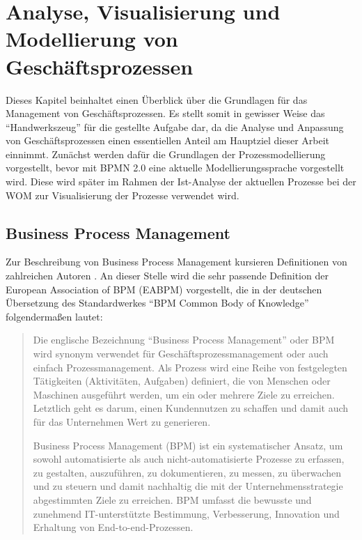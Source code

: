 \documentclass[a4paper,12pt]{report}
\begin{document}
\section{Analyse, Visualisierung und Modellierung von Geschäftsprozessen}\label{sec:BPM}
Dieses Kapitel beinhaltet einen Überblick über die Grundlagen für das Management von Geschäftsprozessen. Es stellt somit in gewisser Weise das "`Handwerkszeug"' für die gestellte Aufgabe dar, da die Analyse und Anpassung von Geschäftsprozessen einen essentiellen Anteil am Hauptziel dieser Arbeit einnimmt. Zunächst werden dafür die Grundlagen der Prozessmodellierung vorgestellt, bevor mit BPMN 2.0 eine aktuelle Modellierungssprache vorgestellt wird. Diese wird später im Rahmen der Ist-Analyse der aktuellen Prozesse bei der \ac{WOM} zur Visualisierung der Prozesse verwendet wird.
\subsection{Business Process Management}\label{subsec:BPManagement}
Zur Beschreibung von Business Process Management kursieren Definitionen von zahlreichen Autoren \citep[vgl.][S. 1]{Freund2014}. An dieser Stelle wird die sehr passende Definition der European Association of BPM (EABPM) vorgestellt, die in der deutschen Übersetzung des Standardwerkes "`BPM Common Body of Knowledge"' \cite[S. 38ff.]{Eabpm2009} folgendermaßen lautet:

\begin{quote}
Die englische Bezeichnung "`Business Process Management"' oder BPM wird synonym verwendet für Geschäftsprozessmanagement oder auch einfach Prozessmanagement. Als Prozess wird eine Reihe von festgelegten Tätigkeiten (Aktivitäten, Aufgaben) definiert, die von Menschen oder Maschinen ausgeführt werden, um ein oder mehrere Ziele zu erreichen. Letztlich geht es darum, einen Kundennutzen zu schaffen und damit auch für das Unternehmen Wert zu generieren.

Business Process Management (BPM) ist ein systematischer Ansatz, um sowohl automatisierte als auch nicht-automatisierte Prozesse zu erfassen, zu gestalten, auszuführen, zu dokumentieren, zu messen, zu überwachen und zu steuern und damit nachhaltig die mit der Unternehmensstrategie abgestimmten Ziele zu erreichen. BPM umfasst die bewusste und zunehmend IT-unterstützte Bestimmung, Verbesserung, Innovation und Erhaltung von End-to-end-Prozessen.
\end{quote}
\end{document}
